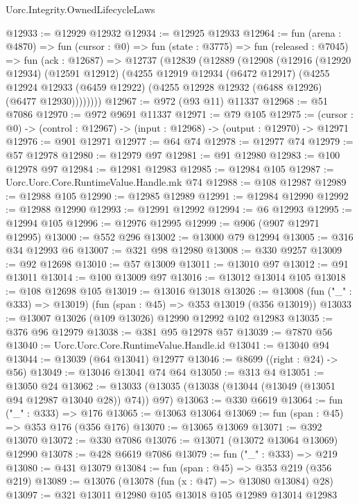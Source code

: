 \begin{lexlean}{Uorc.Integrity.OwnedLifecycleLaws}
\begin{coremodule}
@12933 := @12929 @12932
@12934 := @12925 @12933
@12964 := fun (arena : @4870) =>
  fun (cursor : @0) =>
  fun (state : @3775) =>
  fun (released : @7045) =>
  fun (ack : @12687) =>
  @12737
    (@12839
      (@12889
        (@12908
          (@12916
            (@12920 @12934)
            (@12591 @12912)
            (@4255
              @12919
              @12934
              (@6472 @12917)
              (@4255
                @12924
                @12933
                (@6459 @12922)
                (@4255 @12928 @12932 (@6488 @12926) (@6477 @12930))))))))
@12967 := @972 (@93 @11) @11337
@12968 := @51 @7086
@12970 := @972 @9691 @11337
@12971 := @79 @105
@12975 := (cursor : @0) -> (control : @12967) -> (input : @12968) -> (output : @12970) -> @12971
@12976 := @901 @12971
@12977 := @64 @74
@12978 := @12977 @74
@12979 := @57 @12978
@12980 := @12979 @97
@12981 := @91 @12980
@12983 := @100 @12978 @97
@12984 := @12981 @12983
@12985 := @12984 @105
@12987 := Uorc.Uorc.Core.RuntimeValue.Handle.mk @74
@12988 := @108 @12987
@12989 := @12988 @105
@12990 := @12985 @12989
@12991 := @12984 @12990
@12992 := @12988 @12990
@12993 := @12991 @12992
@12994 := @6 @12993
@12995 := @12994 @105
@12996 := @12976 @12995
@12999 := @906 (@907 @12971 @12995)
@13000 := @552 @296
@13002 := @13000 @79 @12994
@13005 := @316 @34 @12993 @6
@13007 := @321 @98 @12980
@13008 := @330 @9257
@13009 := @92 @12698
@13010 := @57 @13009
@13011 := @13010 @97
@13012 := @91 @13011
@13014 := @100 @13009 @97
@13016 := @13012 @13014 @105
@13018 := @108 @12698 @105
@13019 := @13016 @13018
@13026 := @13008 (fun ("_" : @333) => @13019) (fun (span : @45) => @353 @13019 (@356 @13019))
@13033 := @13007 @13026 (@109 @13026) @12990 @12992 @102 @12983
@13035 := @376 @96 @12979
@13038 := @381 @95 @12978 @57
@13039 := @7870 @56
@13040 := Uorc.Uorc.Core.RuntimeValue.Handle.id
@13041 := @13040 @94
@13044 := @13039 (@64 @13041) @12977
@13046 := @8699 ((right : @24) -> @56)
@13049 := @13046 @13041 @74 @64
@13050 := @313 @4
@13051 := @13050 @24
@13062 := @13033 (@13035 (@13038 (@13044 (@13049 (@13051 @94 @12987 @13040 @28)) @74)) @97)
@13063 := @330 @6619
@13064 := fun ("_" : @333) => @176
@13065 := @13063 @13064
@13069 := fun (span : @45) => @353 @176 (@356 @176)
@13070 := @13065 @13069
@13071 := @392 @13070
@13072 := @330 @7086
@13076 := @13071 (@13072 @13064 @13069) @12990
@13078 := @428 @6619 @7086
@13079 := fun ("_" : @333) => @219
@13080 := @431 @13079
@13084 := fun (span : @45) => @353 @219 (@356 @219)
@13089 := @13076 (@13078 (fun (x : @47) => @13080 @13084) @28)
@13097 := @321 @13011 @12980 @105 @13018 @105 @12989 @13014 @12983

\end{coremodule}
\end{lexlean}
